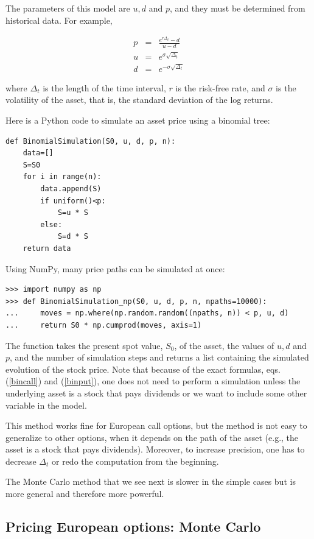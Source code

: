 \documentclass[justified, sixbynine]{tufte-book}
\theoremstyle{plain}%
\newtheorem * {corollary}{Corollary}
\theoremstyle{definition}
\theoremstyle{remark}
\newtheorem * {remark}{Remark}
\newtheorem * {note}{Note}
\begin{document}
\begin{fullwidth}
The parameters of this model are $u, d$ and $p$, and they must be determined
from historical data. For example, 

\begin{eqnarray}
p &=& \frac{e^{r\Delta_t} - d}{u-d} \\
u &=& e^{\sigma\sqrt{\Delta_t}} \\
d &=& e^{-\sigma\sqrt{\Delta_t}}
\end{eqnarray}

where $\Delta_t$ is the length of the time interval, $r$ is the risk-free rate, and $\sigma$ is the volatility of the asset, that is, the standard deviation of the log returns.

Here is a Python code to simulate an asset price using a binomial tree:
\begin{lstlisting}
def BinomialSimulation(S0, u, d, p, n):
    data=[]
    S=S0
    for i in range(n):
        data.append(S)
        if uniform()<p:
            S=u * S
        else:
            S=d * S
    return data
\end{lstlisting}

Using NumPy, many price paths can be simulated at once:

\begin{lstlisting}
>>> import numpy as np
>>> def BinomialSimulation_np(S0, u, d, p, n, npaths=10000):
...     moves = np.where(np.random.random((npaths, n)) < p, u, d)
...     return S0 * np.cumprod(moves, axis=1)
\end{lstlisting}

The function takes the present spot value, $S_0$, of the asset, the values
of $u, d$ and $p$, and the number of simulation steps and returns a list
containing the simulated evolution of the stock price. Note that because of
the exact formulas, eqs.(\ref{bincall}) and (\ref{binput}), one does not need
to perform a simulation unless the underlying asset is a stock that pays
dividends or we want to include some other variable in the model.

This method works fine for European call options, but the method is not easy to
generalize to other options, when it depends on the path of
the asset (e.g., the asset is a stock that pays dividends). Moreover, 
to increase precision, one has to decrease $\Delta _t$ or redo the
computation from the beginning.

The Monte Carlo method that we see next is slower in the simple cases but is
more general and therefore more powerful.

\goodbreak\subsection{Pricing European options: Monte Carlo}


\end{fullwidth}
\end{document}
